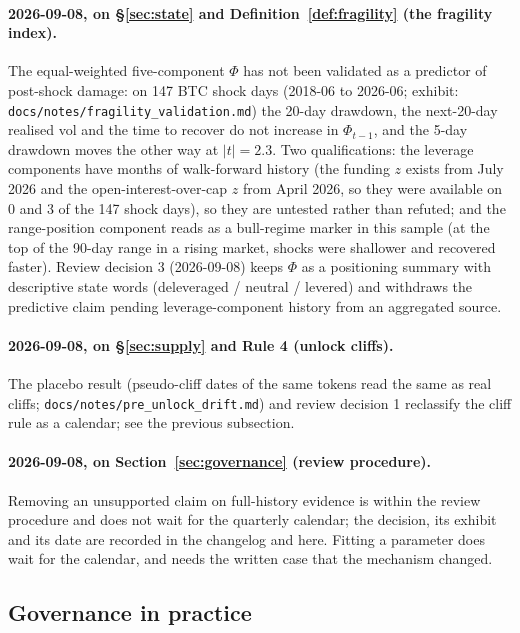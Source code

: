 \documentclass[11pt,a4paper]{article}
\theoremstyle{definition}
\begin{document}
\paragraph{2026-09-08, on \S\ref{sec:state} and Definition~\ref{def:fragility} (the fragility index).} The equal-weighted five-component $\Phi$ has not been validated as a predictor of post-shock damage: on 147 BTC shock days (2018-06 to 2026-06; exhibit: \texttt{docs/notes/fragility\_validation.md}) the 20-day drawdown, the next-20-day realised vol and the time to recover do not increase in $\Phi_{t-1}$, and the 5-day drawdown moves the other way at $|t| = 2.3$. Two qualifications: the leverage components have months of walk-forward history (the funding $z$ exists from July 2026 and the open-interest-over-cap $z$ from April 2026, so they were available on 0 and 3 of the 147 shock days), so they are untested rather than refuted; and the range-position component reads as a bull-regime marker in this sample (at the top of the 90-day range in a rising market, shocks were shallower and recovered faster). Review decision 3 (2026-09-08) keeps $\Phi$ as a positioning summary with descriptive state words (deleveraged / neutral / levered) and withdraws the predictive claim pending leverage-component history from an aggregated source.

\paragraph{2026-09-08, on \S\ref{sec:supply} and Rule 4 (unlock cliffs).} The placebo result (pseudo-cliff dates of the same tokens read the same as real cliffs; \texttt{docs/notes/pre\_unlock\_drift.md}) and review decision 1 reclassify the cliff rule as a calendar; see the previous subsection.

\paragraph{2026-09-08, on Section~\ref{sec:governance} (review procedure).} Removing an unsupported claim on full-history evidence is within the review procedure and does not wait for the quarterly calendar; the decision, its exhibit and its date are recorded in the changelog and here. Fitting a parameter does wait for the calendar, and needs the written case that the mechanism changed.

\subsection{Governance in practice}
\end{document}
